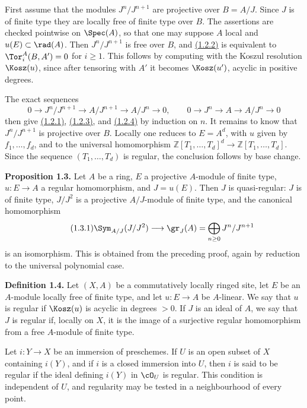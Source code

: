 First assume that the modules \(J^n/J^{n+1}\) are projective over \(B=A/J\). Since \(J\) is of finite type they are locally free of finite type over \(B\). The assertions are checked pointwise on \(\Spec(A)\), so that one may suppose \(A\) local and \(u(E)\subset\rad(A)\). Then \(J^n/J^{n+1}\) is free over \(B\), and \hyperlink{sga6.e07.eq.1-2-2}{(1.2.2)} is equivalent to \(\Tor_i^A(B,A')=0\) for \(i\ge1\). This follows by computing with the Koszul resolution \(\Kosz(u)\), since after tensoring with \(A'\) it becomes \(\Kosz(u')\), acyclic in positive degrees.

The exact sequences
\[
0\to J^n/J^{n+1}\to A/J^{n+1}\to A/J^n\to0,
\qquad
0\to J^n\to A\to A/J^n\to0
\]
then give \hyperlink{sga6.e07.eq.1-2-1}{(1.2.1)}, \hyperlink{sga6.e07.eq.1-2-3}{(1.2.3)}, and \hyperlink{sga6.e07.eq.1-2-4}{(1.2.4)} by induction on \(n\). It remains to know that \(J^n/J^{n+1}\) is projective over \(B\). Locally one reduces to \(E=A^d\), with \(u\) given by \(f_1,\ldots,f_d\), and to the universal homomorphism \(\mathbb Z[T_1,\ldots,T_d]^d\to \mathbb Z[T_1,\ldots,T_d]\). Since the sequence \((T_1,\ldots,T_d)\) is regular, the conclusion follows by base change.

\textbf{Proposition 1.3.} Let \(A\) be a ring, \(E\) a projective \(A\)-module of finite type, \(u:E\to A\) a regular homomorphism, and \(J=u(E)\). Then \(J\) is quasi-regular: \(J\) is of finite type, \(J/J^2\) is a projective \(A/J\)-module of finite type, and the canonical homomorphism
\begin{equation}\tag{1.3.1}
 \Sym_{A/J}(J/J^2)\longrightarrow \gr_J(A)=\bigoplus_{n\ge0}J^n/J^{n+1}
\end{equation}
is an isomorphism. This is obtained from the preceding proof, again by reduction to the universal polynomial case.

\textbf{Definition 1.4.} Let \((X,A)\) be a commutatively locally ringed site, let \(E\) be an \(A\)-module locally free of finite type, and let \(u:E\to A\) be \(A\)-linear. We say that \(u\) is regular if \(\Kosz(u)\) is acyclic in degrees \(>0\). If \(J\) is an ideal of \(A\), we say that \(J\) is regular if, locally on \(X\), it is the image of a surjective regular homomorphism from a free \(A\)-module of finite type.

Let \(i:Y\to X\) be an immersion of preschemes. If \(U\) is an open subset of \(X\) containing \(i(Y)\), and if \(i\) is a closed immersion into \(U\), then \(i\) is said to be regular if the ideal defining \(i(Y)\) in \(\cO_U\) is regular. This condition is independent of \(U\), and regularity may be tested in a neighbourhood of every point.

